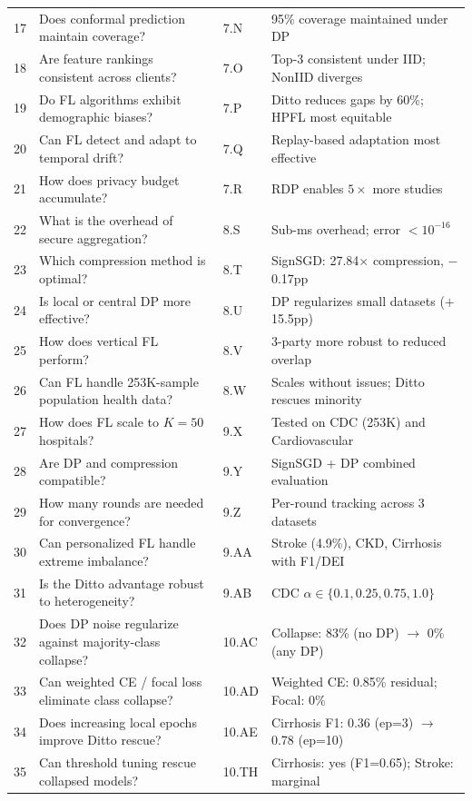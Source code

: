 \documentclass[conference]{IEEEtran}
\begin{document}
\begin{table}[htbp]
{\begin{tabular}{clll}
17 & Does conformal prediction maintain coverage? & 7.N & 95\% coverage maintained under DP \\
18 & Are feature rankings consistent across clients? & 7.O & Top-3 consistent under IID; NonIID diverges \\
19 & Do FL algorithms exhibit demographic biases? & 7.P & Ditto reduces gaps by 60\%; HPFL most equitable \\
20 & Can FL detect and adapt to temporal drift? & 7.Q & Replay-based adaptation most effective \\
21 & How does privacy budget accumulate? & 7.R & RDP enables $5\times$ more studies \\
22 & What is the overhead of secure aggregation? & 8.S & Sub-ms overhead; error $<10^{-16}$ \\
23 & Which compression method is optimal? & 8.T & SignSGD: 27.84$\times$ compression, $-$0.17pp \\
24 & Is local or central DP more effective? & 8.U & DP regularizes small datasets ($+$15.5pp) \\
25 & How does vertical FL perform? & 8.V & 3-party more robust to reduced overlap \\
26 & Can FL handle 253K-sample population health data? & 8.W & Scales without issues; Ditto rescues minority \\
27 & How does FL scale to $K{=}50$ hospitals? & 9.X & Tested on CDC (253K) and Cardiovascular \\
28 & Are DP and compression compatible? & 9.Y & SignSGD + DP combined evaluation \\
29 & How many rounds are needed for convergence? & 9.Z & Per-round tracking across 3 datasets \\
30 & Can personalized FL handle extreme imbalance? & 9.AA & Stroke (4.9\%), CKD, Cirrhosis with F1/DEI \\
31 & Is the Ditto advantage robust to heterogeneity? & 9.AB & CDC $\alpha{\in}\{0.1, 0.25, 0.75, 1.0\}$ \\
\midrule
32 & Does DP noise regularize against majority-class collapse? & 10.AC & Collapse: 83\% (no DP) $\to$ 0\% (any DP) \\
33 & Can weighted CE / focal loss eliminate class collapse? & 10.AD & Weighted CE: 0.85\% residual; Focal: 0\% \\
34 & Does increasing local epochs improve Ditto rescue? & 10.AE & Cirrhosis F1: 0.36 (ep=3) $\to$ 0.78 (ep=10) \\
35 & Can threshold tuning rescue collapsed models? & 10.TH & Cirrhosis: yes (F1=0.65); Stroke: marginal \\

\end{tabular}}
\end{table}
\end{document}
